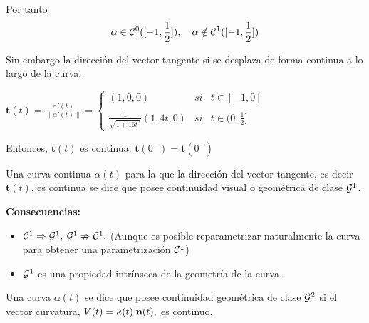 \documentclass[twoside]{report}
\begin{document}
\vspace{0.3cm}

Por tanto $$\alpha\in {\cal C}^0([-1,\frac{1}{2}]), \quad \alpha\notin {\cal C}^1([-1,\frac{1}{2}])$$

Sin embargo la dirección del vector tangente si se desplaza de forma continua a lo largo de la curva.

$\mathbf{t}(t)=\frac{\alpha'(t)}{\parallel\alpha'(t)\parallel}=\left\{\begin{array}{ccc}
(1,0,0) & si & t\in [-1,0]\\
 & & \\
\displaystyle \frac{1}{\sqrt{1+16t^2}}(1,4t,0) & si & t\in (0,
\frac{1}{2}]
\end{array}\right.$

\vspace{0.3cm}


Entonces, $\mathbf{t}(t)$ es continua: $\mathbf{t}(0^{-})= \mathbf{t}(0^{+})$

\vspace{0.3cm}

\begin{defi} Una curva continua $\alpha(t)$ para la que la dirección del vector tangente, es decir $\mathbf{t}(t)$, es continua se dice que posee continuidad visual o geométrica de clase ${\cal G}^1$.
\end{defi}

\vspace{0.3cm}

{\bf Consecuencias:}
\begin{itemize}
\item ${\cal C}^1 \Rightarrow {\cal G}^1,$ \hspace{0.5cm} $ {\cal G}^1 \nRightarrow {\cal C}^1.$ (Aunque es posible reparametrizar naturalmente la curva para obtener una parametrización $ {\cal C}^1$)
\item ${\cal G}^1$ es una propiedad intrínseca  de la geometría de la curva.
\end{itemize}

\vspace{0.3cm}

\begin{defi} Una curva $\alpha(t)$ se dice que posee continuidad geométrica de clase ${\cal G}^2$ si el vector curvatura, $V(t)=\kappa(t) \; {\bf n}(t),$ es continuo.
\end{defi}

\vspace{0.5cm}
\end{document}
